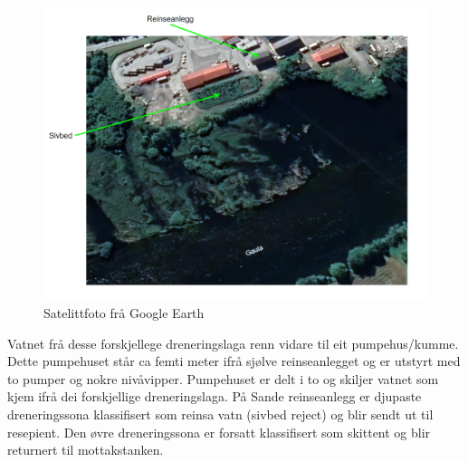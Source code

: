 \begin{figure}[htbp]
    \centering
    \includegraphics[width=1\textwidth]{Bilder/SatelittFoto.png}
    \caption{Satelittfoto frå Google Earth \citep{Google} }\label{fig:Sivbed}
\end{figure}

\newpage

Vatnet frå desse forskjellege dreneringslaga renn vidare til eit pumpehus/kumme.
Dette pumpehuset står ca femti meter ifrå sjølve reinseanlegget og er utstyrt med to pumper og nokre nivåvipper.
Pumpehuset er delt i to og skiljer vatnet som kjem ifrå dei forskjellige dreneringslaga.\newline
På Sande reinseanlegg er djupaste dreneringssona klassifisert som reinsa vatn (sivbed reject) og blir sendt ut til resepient.
Den øvre dreneringssona er forsatt klassifisert som skittent og blir returnert til mottakstanken. \newline \newline \newline \newline \newline

